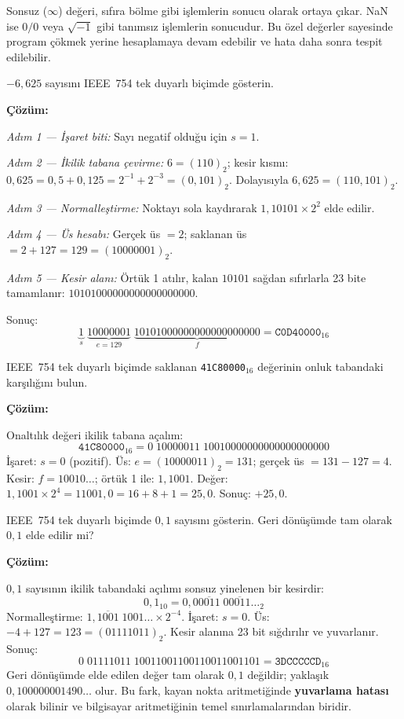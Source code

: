 Sonsuz ($\infty$) değeri, sıfıra bölme gibi işlemlerin sonucu olarak ortaya çıkar. NaN ise $0/0$ veya $\sqrt{-1}$ gibi tanımsız işlemlerin sonucudur. Bu özel değerler sayesinde program çökmek yerine hesaplamaya devam edebilir ve hata daha sonra tespit edilebilir.

\begin{ornek}[A.24]
$-6{,}625$ sayısını IEEE~754 tek duyarlı biçimde gösterin.

\textbf{Çözüm:}

\textit{Adım 1 --- İşaret biti:} Sayı negatif olduğu için $s = 1$.

\textit{Adım 2 --- İkilik tabana çevirme:} $6 = (110)_2$; kesir kısmı: $0{,}625 = 0{,}5 + 0{,}125 = 2^{-1} + 2^{-3} = (0{,}101)_2$. Dolayısıyla $6{,}625 = (110{,}101)_2$.

\textit{Adım 3 --- Normalleştirme:} Noktayı sola kaydırarak $1{,}10101 \times 2^2$ elde edilir.

\textit{Adım 4 --- Üs hesabı:} Gerçek üs $= 2$; saklanan üs $= 2 + 127 = 129 = (10000001)_2$.

\textit{Adım 5 --- Kesir alanı:} Örtük 1 atılır, kalan $10101$ sağdan sıfırlarla 23 bite tamamlanır: $10101000000000000000000$.

Sonuç:
\[
\underbrace{1}_{s}\;\underbrace{10000001}_{e=129}\;\underbrace{10101000000000000000000}_{f} = \texttt{C0D40000}_{16}
\]
\end{ornek}

\begin{ornek}[A.25]
IEEE~754 tek duyarlı biçimde saklanan \texttt{41C80000}$_{16}$ değerinin onluk tabandaki karşılığını bulun.

\textbf{Çözüm:}

Onaltılık değeri ikilik tabana açalım:
\[
\texttt{41C80000}_{16} = 0\;10000011\;10010000000000000000000
\]
İşaret: $s = 0$ (pozitif). Üs: $e = (10000011)_2 = 131$; gerçek üs $= 131 - 127 = 4$. Kesir: $f = 10010\ldots$; örtük 1 ile: $1{,}1001$. Değer: $1{,}1001 \times 2^4 = 11001{,}0 = 16 + 8 + 1 = 25{,}0$. Sonuç: $+25{,}0$.
\end{ornek}

\begin{ornek}[A.26]
IEEE~754 tek duyarlı biçimde $0{,}1$ sayısını gösterin. Geri dönüşümde tam olarak $0{,}1$ elde edilir mi?

\textbf{Çözüm:}

$0{,}1$ sayısının ikilik tabandaki açılımı sonsuz yinelenen bir kesirdir:
\[
0{,}1_{10} = 0{,}0\overline{0011}\;0\overline{0011}\ldots_2
\]
Normalleştirme: $1{,}\overline{1001}\;1001\ldots \times 2^{-4}$. İşaret: $s = 0$. Üs: $-4 + 127 = 123 = (01111011)_2$. Kesir alanına 23 bit sığdırılır ve yuvarlanır. Sonuç:
\[
0\;01111011\;10011001100110011001101 = \texttt{3DCCCCCD}_{16}
\]
Geri dönüşümde elde edilen değer tam olarak $0{,}1$ değildir; yaklaşık $0{,}100000001490\ldots$ olur. Bu fark, kayan nokta aritmetiğinde \textbf{yuvarlama hatası} olarak bilinir ve bilgisayar aritmetiğinin temel sınırlamalarından biridir.
\end{ornek}


